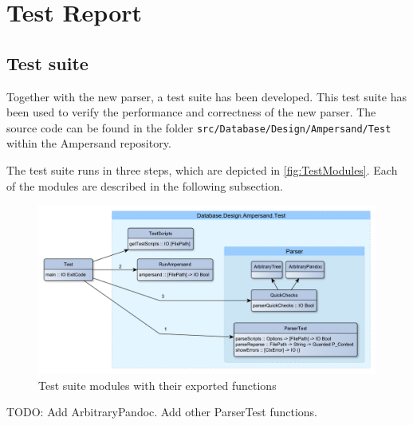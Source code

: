 
\section{Test Report}
\label{sec:tests}

\subsection{Test suite}
  Together with the new parser, a test suite has been developed.
  This test suite has been used to verify the performance and correctness of the new parser.
  The source code can be found in the folder \texttt{src/Database/Design/Ampersand/Test} within the Ampersand repository.

  The test suite runs in three steps, which are depicted in \autoref{fig:TestModules}.
  Each of the modules are described in the following subsection.
  \begin{figure}[ht]%
    \includegraphics[width=\columnwidth]{Figures/TestModules.pdf}
    \caption{Test suite modules with their exported functions}
    \label{fig:TestModules}
  \end{figure}%
  TODO: Add ArbitraryPandoc. Add other ParserTest functions.

